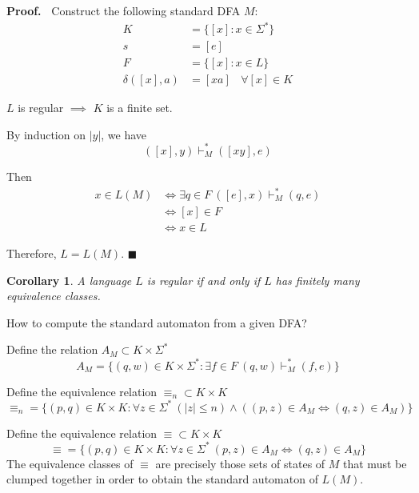 \documentclass[aps,pra,onecolumn,notitlepage,superscriptaddress]{revtex4-1}
\def\ys{\vdash^*}
\newtheorem{cor}{Corollary}
\def\Proof{{\bf Proof.~}}
\def\qed{$\blacksquare$ \newline}
\begin{document}
    \Proof
    Construct the following standard DFA $M$:
    \begin{align*}
        K &= \{ [x] : x \in \Sigma^* \} \\
        s &= [e] \\
        F &= \{ [x] : x \in L \} \\
        \delta([x], a) &= [xa] \ \ \ \ \forall [x] \in K
    \end{align*}

    $L$ is regular $\implies$ $K$ is a finite set. 

    By induction on $|y|$, we have
    \begin{equation}
        ([x], y) \ys_M ([xy], e)
    \end{equation}

    Then
    \begin{align*}
        x \in L(M) 
        &\Leftrightarrow \exists q \in F \ ([e],x) \ys_M (q,e)  \\
        &\Leftrightarrow [x] \in F \\
        &\Leftrightarrow x \in L
    \end{align*}

    Therefore, $L = L(M)$.
    \qed    


    \begin{cor}
        A language $L$ is regular if and only if $L$ has finitely many equivalence classes.
    \end{cor}

    How to compute the standard automaton from a given DFA?

    Define the relation $A_M \subset K \times \Sigma^*$
    \begin{equation*}
        A_M = \{ (q,w) \in K \times \Sigma^*: \exists f \in F \ (q,w) \ys_M (f,e) \}
    \end{equation*}

    Define the equivalence relation $\equiv_n \subset K \times K$
    \begin{equation}
        \equiv_n = \{ (p,q) \in K \times K : \forall z \in \Sigma^* \ (|z| \leq n) \land ((p,z) \in A_M \Leftrightarrow (q,z) \in A_M) \}
    \end{equation}

    Define the equivalence relation $\equiv \subset K \times K$
    \begin{equation}
        \equiv = \{ (p,q) \in K \times K : \forall z \in \Sigma^* \ (p,z) \in A_M \Leftrightarrow (q,z) \in A_M \}
    \end{equation}
    The equivalence classes of $\equiv$ are precisely those sets of states of $M$ that must be clumped together in order to obtain the standard automaton of $L(M)$.
\end{document}

